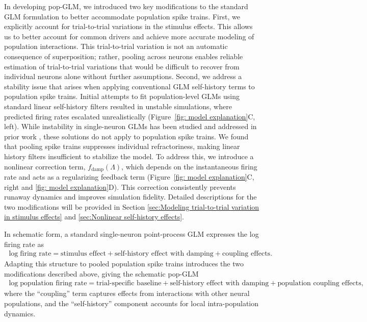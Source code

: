 \documentclass[12pt]{article}
\begin{document}
In developing pop-GLM, we introduced two key modifications to the standard GLM formulation to better accommodate population spike trains. First, we explicitly account for trial-to-trial variations in the stimulus effects. This allows us to better account for common drivers and achieve more accurate modeling of population interactions. This trial-to-trial variation is not an automatic consequence of superposition; rather, pooling across neurons enables reliable estimation of trial-to-trial variations that would be difficult to recover from individual neurons alone without further assumptions. Second, we address a stability issue that arises when applying conventional GLM self-history terms to population spike trains. Initial attempts to fit population-level GLMs using standard linear self-history filters resulted in unstable simulations, where predicted firing rates escalated unrealistically (Figure~\ref{fig: model explanation}C, left). While instability in single-neuron GLMs has been studied and addressed in prior work \cite{chen2019stability, hocker2017multistep, gerhard2017stability, park2013spectral, arribas2020rescuing}, these solutions do not apply to population spike trains. We found that pooling spike trains suppresses individual refractoriness, making linear history filters insufficient to stabilize the model. To address this, we introduce a nonlinear correction term, $f_{\text{damp}}(\Lambda)$, which depends on the instantaneous firing rate and acts as a regularizing feedback term (Figure~\ref{fig: model explanation}C, right and \ref{fig: model explanation}D). This correction consistently prevents runaway dynamics and improves simulation fidelity. Detailed descriptions for the two modifications will be provided in Section \ref{sec:Modeling trial-to-trial variation in stimulus effects} and \ref{sec:Nonlinear self-history effects}.

In schematic form, a standard single-neuron point-process GLM expresses the log firing rate as
\begin{align*}
\log \text{firing rate} = \text{stimulus effect} + \text{self-history effect with damping} + \text{coupling effects}.
\end{align*}
Adapting this structure to pooled population spike trains introduces the two modifications described above, giving the schematic pop-GLM
\begin{align*}
\log \text{population firing rate} = \text{trial-specific baseline} + \text{self-history effect with damping} + \text{population coupling effects},
\end{align*}
where the ``coupling'' term captures effects from interactions with other neural populations, and the ``self-history'' component accounts for local intra-population dynamics.
\end{document}
